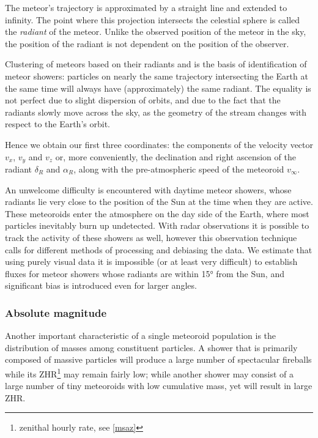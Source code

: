             The meteor's trajectory is approximated by a straight line and extended to infinity.
            The point where this projection intersects the celestial sphere is called the \emph{radiant} of the meteor.
            Unlike the observed position of the meteor in the sky,
            the position of the radiant is not dependent on the position of the observer.

            Clustering of meteors based on their radiants and is the basis of identification
            of meteor showers: particles on nearly the same trajectory intersecting
            the Earth at the same time will always have (approximately) the same radiant.
            The equality is not perfect due to slight dispersion of orbits,
            and due to the fact that the radiants slowly move across the sky,
            as the geometry of the stream changes with respect to the Earth's orbit.

            Hence we obtain our first three coordinates: the components of the velocity vector $v_x$, $v_y$ and $v_z$
            or, more conveniently, the declination and right ascension of the radiant $\delta_R$ and $\alpha_R$,
            along with the pre-atmospheric speed of the meteoroid $v_\infty$.

            An unwelcome difficulty is encountered with daytime meteor showers, whose radiants
            lie very close to the position of the Sun at the time when they are active.
            These meteoroids enter the atmosphere on the day side of the Earth,
            where most particles inevitably burn up undetected.
            With radar observations it is possible to track the activity of these showers as well,
            however this observation technique calls for different methods of processing and debiasing the data.
            We estimate that using purely visual data it is impossible (or at least very difficult) to establish fluxes
            for meteor showers whose radiants are within \ang{15} from the Sun, and significant bias
            is introduced even for larger angles.

        \subsubsection{Absolute magnitude} \label{mspm}
            Another important characteristic of a single meteoroid population is the distribution of masses
            among constituent particles. A shower that is primarily composed of massive particles
            will produce a large number of spectacular fireballs while its ZHR\footnote{zenithal hourly rate, see \cref{msaz}} may remain fairly low;
            while another shower may consist of a large number of tiny meteoroids with low cumulative mass,
            yet will result in large ZHR.

